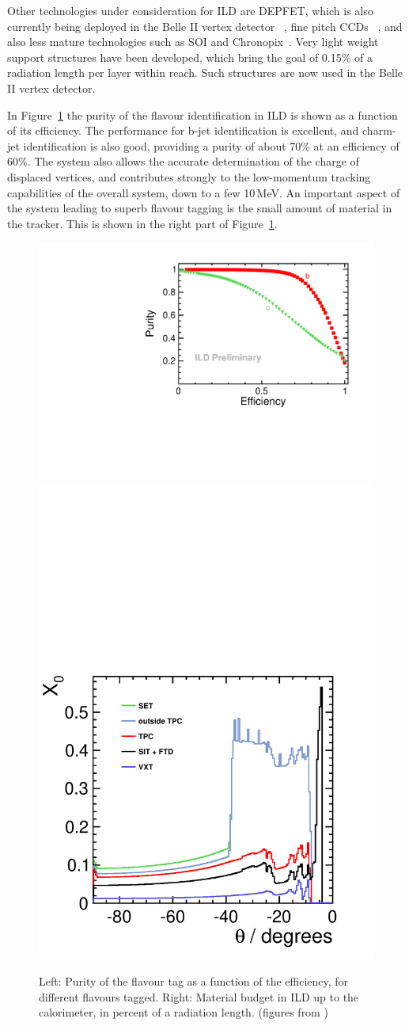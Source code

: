 \documentclass[%
 amsmath,amssymb,
 aps,
 longbibliography,
]{revtex4-1}
\begin{document}
Other technologies under consideration for ILD are DEPFET, which is also currently being deployed in the Belle II vertex detector ~\cite{Luetticke:2017zpx}, fine pitch CCDs ~\cite{fineCCD}, and also less mature technologies such as SOI and Chronopix~\cite{RDliaision}.
Very light weight support structures have been developed, which bring the goal of 0.15\% of a radiation length per layer within reach. Such structures are now used in the Belle II vertex detector.

In Figure~\ref{fig-btag} the purity of the flavour identification in ILD is shown as a function of its efficiency.
The performance for b-jet identification is excellent, and charm-jet identification is also good, providing a purity of about 70\% at an efficiency of 60\%.
 The system also allows the accurate determination of the charge of displaced vertices, and contributes strongly to the low-momentum tracking capabilities of the overall system, down to a few 10\,MeV. An important aspect of the system leading to superb flavour tagging is the small amount of material in the tracker. This is shown in the right part of Figure~\ref{fig-btag}.
\begin{figure}
    \centering
    \includegraphics[width=0.45\hsize]{figures/flavour_tag_v02-00-02_btagctag.pdf}
    \includegraphics[width=0.35\hsize]{figures/material-budget-new.pdf}
    \caption{Left: Purity of the flavour tag as a function of the efficiency, for different flavours tagged. Right: Material budget in ILD up to the calorimeter, in percent of a radiation length. (figures from \cite{LCWS2018})}
    \label{fig-btag}
\end{figure}  
\end{document}
